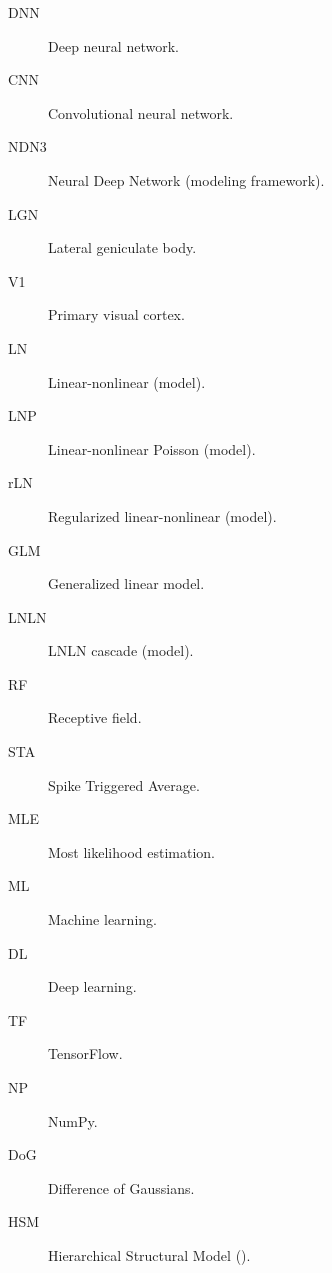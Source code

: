 
\begin{description}
	
	\item[DNN] Deep neural network.
	
	\item[CNN] Convolutional neural network.
	
	\item[NDN3] Neural Deep Network (modeling framework).
	
	\item[LGN] Lateral geniculate body.
	
	\item[V1] Primary visual cortex.
	
	\item[LN] Linear-nonlinear (model).
	
	\item[LNP] Linear-nonlinear Poisson (model).

	\item[rLN] Regularized linear-nonlinear (model).

	\item[GLM] Generalized linear model.

	\item[LNLN] LNLN cascade (model).

	\item[RF] Receptive field.

	\item[STA] Spike Triggered Average.

	\item[MLE] Most likelihood estimation.

	\item[ML] Machine learning.

	\item[DL] Deep learning.

	\item[TF] TensorFlow.

	\item[NP] NumPy.

	\item[DoG] Difference of Gaussians.

	\item[HSM] Hierarchical Structural Model (\cite{antolik}).
	
\end{description}

